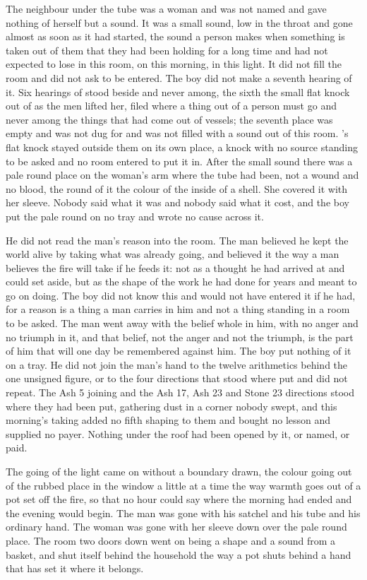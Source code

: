 The neighbour under the tube was a woman and was not named and gave nothing of herself but a sound. It was a small sound, low in the throat and gone almost as soon as it had started, the sound a person makes when something is taken out of them that they had been holding for a long time and had not expected to lose in this room, on this morning, in this light. It did not fill the room and did not ask to be entered. The boy did not make a seventh hearing of it. Six hearings of  stood beside and never among, the sixth the small flat knock out of  as the men lifted her, filed where a thing out of a person must go and never among the things that had come out of vessels; the seventh place was empty and was not dug for and was not filled with a sound out of this room. 's flat knock stayed outside them on its own place, a knock with no source standing to be asked and no room entered to put it in. After the small sound there was a pale round place on the woman's arm where the tube had been, not a wound and no blood, the round of it the colour of the inside of a shell. She covered it with her sleeve. Nobody said what it was and nobody said what it cost, and the boy put the pale round on no tray and wrote no cause across it.

He did not read the man's reason into the room. The man believed he kept the world alive by taking what was already going, and believed it the way a man believes the fire will take if he feeds it: not as a thought he had arrived at and could set aside, but as the shape of the work he had done for years and meant to go on doing. The boy did not know this and would not have entered it if he had, for a reason is a thing a man carries in him and not a thing standing in a room to be asked. The man went away with the belief whole in him, with no anger and no triumph in it, and that belief, not the anger and not the triumph, is the part of him that will one day be remembered against him. The boy put nothing of it on a tray. He did not join the man's hand to the twelve arithmetics behind the one unsigned figure, or to the four directions that stood where put and did not repeat. The Ash 5 joining and the Ash 17, Ash 23 and Stone 23 directions stood where they had been put, gathering dust in a corner nobody swept, and this morning's taking added no fifth shaping to them and bought no lesson and supplied no payer. Nothing under the roof had been opened by it, or named, or paid.

The going of the light came on without a boundary drawn, the colour going out of the rubbed place in the window a little at a time the way warmth goes out of a pot set off the fire, so that no hour could say where the morning had ended and the evening would begin. The man was gone with his satchel and his tube and his ordinary hand. The woman was gone with her sleeve down over the pale round place. The room two doors down went on being a shape and a sound from a basket, and shut itself behind the household the way a pot shuts behind a hand that has set it where it belongs.

